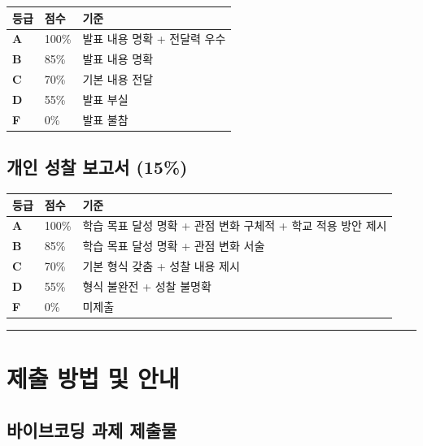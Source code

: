 \documentclass[11pt, a4paper]{article}
\begin{document}
\begin{table}[h]
\centering
\begin{tabular}{|C{1.5cm}|C{1.5cm}|L{10.5cm}|}
\hline
{}
\textbf{등급} & \textbf{점수} & \textbf{기준} \\
\hline
\textbf{A} & 100\% & 발표 내용 명확 + 전달력 우수 \\
\hline
\textbf{B} & 85\% & 발표 내용 명확 \\
\hline
\textbf{C} & 70\% & 기본 내용 전달 \\
\hline
\textbf{D} & 55\% & 발표 부실 \\
\hline
\textbf{F} & 0\% & 발표 불참 \\
\hline
\end{tabular}
\end{table}

\subsection{개인 성찰 보고서 (15\%)}

\begin{table}[h]
\centering
\begin{tabular}{|C{1.5cm}|C{1.5cm}|L{10.5cm}|}
\hline
{}
\textbf{등급} & \textbf{점수} & \textbf{기준} \\
\hline
\textbf{A} & 100\% & 학습 목표 달성 명확 + 관점 변화 구체적 + 학교 적용 방안 제시 \\
\hline
\textbf{B} & 85\% & 학습 목표 달성 명확 + 관점 변화 서술 \\
\hline
\textbf{C} & 70\% & 기본 형식 갖춤 + 성찰 내용 제시 \\
\hline
\textbf{D} & 55\% & 형식 불완전 + 성찰 불명확 \\
\hline
\textbf{F} & 0\% & 미제출 \\
\hline
\end{tabular}
\end{table}

\vspace{3pt}
\noindent\rule{\textwidth}{0.3pt}

\section{제출 방법 및 안내}

\subsection{바이브코딩 과제 제출물}
\end{document}
